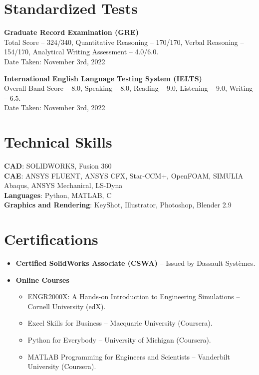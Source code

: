 \documentclass[letterpaper,11pt]{article}
\begin{document}
\section{Standardized Tests}
\begin{itemize}[leftmargin=0in, label={}]
{\item{
\textbf{Graduate Record Examination (GRE)} \\Total Score – 324/340, Quantitative Reasoning – 170/170, Verbal Reasoning – 154/170, Analytical Writing Assessment – 4.0/6.0.\\
Date Taken: November 3rd, 2022
}}
{\item{
{\textbf{International English Language Testing System (IELTS)}\\
Overall Band Score – 8.0, Speaking – 8.0, Reading – 9.0, Listening – 9.0, Writing – 6.5.\\
Date Taken: November 3rd, 2022}}}
\end{itemize}

\section{Technical Skills}
\begin{itemize}[leftmargin=0in, label={}]
{\item{
\textbf{CAD}{: SOLIDWORKS, Fusion 360} \\
\textbf{CAE}{: ANSYS FLUENT, ANSYS CFX, Star-CCM+, OpenFOAM, SIMULIA Abaqus, ANSYS Mechanical, LS-Dyna} \\
\textbf{Languages}{: Python, MATLAB, C} \\
\textbf{Graphics and Rendering}{: KeyShot, Illustrator, Photoshop, Blender 2.9} \\
}}
\end{itemize}
\vspace{-16pt}

\section{Certifications}
\begin{itemize}[leftmargin=0.15in]
\item {\textbf{Certified SolidWorks Associate (CSWA)}} – Issued by Dassault Systèmes.
\item \textbf{Online Courses}
\begin{itemize}
\item ENGR2000X: A Hands-on Introduction to Engineering Simulations – Cornell University (edX).
\item Excel Skills for Business – Macquarie University (Coursera).
\item Python for Everybody – University of Michigan (Coursera).
\item MATLAB Programming for Engineers and Scientists – Vanderbilt University (Coursera).
\end{itemize}
\end{itemize}
\end{document}
